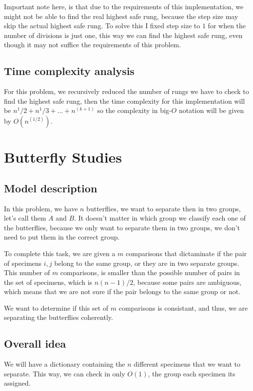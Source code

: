 \documentclass{article}
\begin{document}
Important note here, is that due to the requirements of this implementation, we might not be able to find the real highest safe rung, because the step size may skip the actual highest safe rung. To solve this I fixed step size to $1$ for when the number of divisions is just one, this way we can find the highest safe rung, even though it may not suffice the requirements of this problem.

\subsection*{Time complexity analysis}

For this problem, we recursively reduced the number of rungs we have to check to find the highest safe rung, then the time complexity for this implementation will be $n^1/2+n^1/3+...+n^(k+1)$ so the complexity in big-$O$ notation will be given by $O(n^(1/2))$.

\section*{Butterfly Studies}

\subsection*{Model description}

In this problem, we have $n$ butterflies, we want to separate then in two groups, let's call them $A$ and $B$. It doesn't matter in which group we classify each one of the butterflies, because we only want to separate them in two groups, we don't need to put them in the correct group.

To complete this task, we are given a $m$ comparisons that dictaminate if the pair of specimens $i,j$ belong to the same group, or they are in two separate groups. This number of $m$ comparisons, is smaller than the possible number of pairs in the set of specimens, which is $n(n-1)/2$, because some pairs are ambiguous, which means that we are not sure if the pair belongs to the same group or not.

We want to determine if this set of $m$ comparisons is consistant, and thus, we are separating the butterflies coherently.

\subsection*{Overall idea}

We will have a dictionary containing the $n$ different specimens that we want to separate. This way, we can check in only $O(1)$, the group each specimen its assigned.
\end{document}

